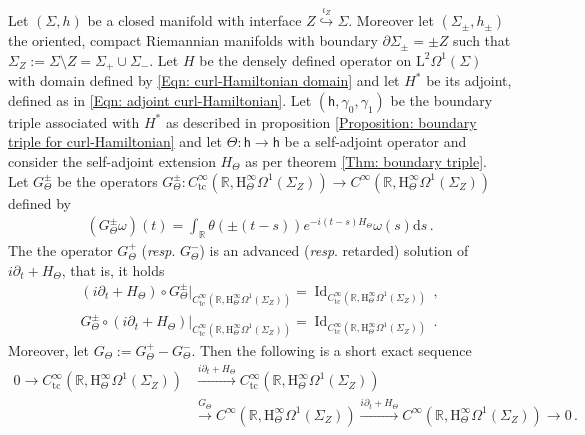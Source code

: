 \begin{proposition}\label{Prop: exact sequence for Maxwell equations with interface}
	Let $(\Sigma,h)$ be a closed manifold with interface $Z\stackrel{\iota_Z}{\hookrightarrow}\Sigma$.
	Moreover let $(\Sigma_\pm,h_\pm)$ the oriented, compact Riemannian manifolds with boundary $\partial\Sigma_\pm=\pm Z$ such that $\Sigma_Z:=
	\Sigma\setminus Z=\Sigma_+\cup\Sigma_-$.
	Let $H$ be the densely defined operator on $\mathrm{L}^2\Omega^1(\Sigma)$ with domain defined by \eqref{Eqn: curl-Hamiltonian domain} and let $H^*$ be its adjoint, defined as in \eqref{Eqn: adjoint curl-Hamiltonian}.
	Let $(\mathsf{h},\gamma_0,\gamma_1)$ be the boundary triple associated with $H^*$ as described in proposition \ref{Proposition: boundary triple for curl-Hamiltonian} and let $\Theta\colon\mathsf{h}\to\mathsf{h}$ be a self-adjoint operator and consider the self-adjoint extension $H_\Theta$ as per theorem \ref{Thm: boundary triple}.
	Let $G^\pm_\Theta$ be the operators $G^\pm_\Theta\colon C^\infty_{\mathrm{tc}}(\mathbb{R},\mathrm{H}^\infty_\Theta\Omega^1(\Sigma_Z))\to C^\infty(\mathbb{R},\mathrm{H}^\infty_\Theta\Omega^1(\Sigma_Z))$ defined by
	\begin{align}
		(G^\pm_\Theta \omega)(t)=\int_{\mathbb{R}}\theta(\pm(t-s))e^{-i(t-s)H_\Theta}\omega(s)\mathrm{d}s\,.
	\end{align}
	The the operator $G^+_\Theta$ (\textit{resp}. $G^-_\Theta$) is an advanced (\textit{resp}. retarded) solution of $i\partial_t+H_\Theta$, that is, it holds
	\begin{align}
		(i\partial_t+H_\Theta)\circ G_\Theta^\pm|_{C^\infty_{\mathrm{tc}}(\mathbb{R},\mathrm{H}^\infty_\Theta\Omega^1(\Sigma_Z))}=
		\operatorname{Id}_{C^\infty_{\mathrm{tc}}(\mathbb{R},\mathrm{H}^\infty_\Theta\Omega^1(\Sigma_Z))}\,,\\
		G_\Theta^\pm\circ(i\partial_t+H_\Theta)|_{C^\infty_{\mathrm{tc}}(\mathbb{R},\mathrm{H}^\infty_\Theta\Omega^1(\Sigma_Z))}=
		\operatorname{Id}_{C^\infty_{\mathrm{tc}}(\mathbb{R},\mathrm{H}^\infty_\Theta\Omega^1(\Sigma_Z))}\,.
	\end{align}
	Moreover, let $G_\Theta:=G^+_\Theta-G^-_\Theta$.
	Then the following is a short exact sequence
	\begin{align}
	\nonumber
	0\to
	C^\infty_{\mathrm{tc}}(\mathbb{R},\mathrm{H}^\infty_\Theta\Omega^1(\Sigma_Z))
	&\stackrel{i\partial_t+H_\Theta}{\to}
	C^\infty_{\mathrm{tc}}(\mathbb{R},\mathrm{H}^\infty_\Theta\Omega^1(\Sigma_Z))\\&
	\label{Eqn: exact sequence}
	\stackrel{G_\Theta}{\to}
	C^\infty(\mathbb{R},\mathrm{H}^\infty_\Theta\Omega^1(\Sigma_Z))
	\stackrel{i\partial_t+H_\Theta}{\to}
	C^\infty(\mathbb{R},\mathrm{H}^\infty_\Theta\Omega^1(\Sigma_Z))
	\to 0\,.
	\end{align}
\end{proposition}
